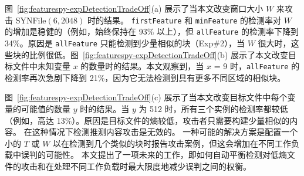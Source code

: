图~\ref{fig:featurespy-expDetectionTradeOff}(a) 展示了当本文改变窗口大小 $W$ 来攻击 SYNFile$(6, 2048)$ 时的结果。 {\tt firstFeature} 和 {\tt minFeature} 的检测率对 $W$ 的增加是稳健的（例如，始终保持在 93\% 以上），但 {\tt allFeature} 的检测率下降到 34\%。原因是 {\tt allFeature} 只能检测到少量相似的块（Exp\#2），当 $W$ 很大时，这些块的比例很低。图~\ref{fig:featurespy-expDetectionTradeOff}(b) 展示了本文改变目标文件中未知变量 $x$ 的数量时的结果。本文观察到，当 $x$ = 9 时，{\tt allFeature} 的检测率再次急剧下降到 21\%，因为它无法检测到具有更多不同区域的相似块。


图~\ref{fig:featurespy-expDetectionTradeOff}(c) 展示了当本文改变目标文件中每个变量的可能值的数量 $y$ 时的结果。当 $y$ 为 512 时，所有三个实例的检测率都较低（例如，高达 13\%）。原因是目标文件的熵较低，攻击者只需要构建少量相似的内容。 \sysnameF 在这种情况下检测推测内容攻击是无效的。 一种可能的解决方案是配置一个小的 $T$ 或 $W$ 以在检测到几个类似的块时报告攻击案例，但这会增加在不同工作负载中误判的可能性。 本文提出了一项未来的工作，即如何自动平衡检测对低熵文件的攻击和在处理不同工作负载时最大限度地减少误判之间的权衡。